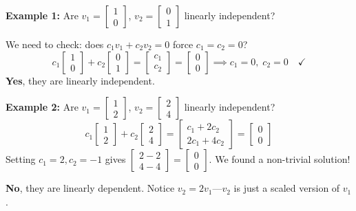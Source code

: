 \documentclass[11pt]{article}
\theoremstyle{definition}
\theoremstyle{plain}
\theoremstyle{remark}
\begin{document}
\begin{workedexample}[title=\textbf{Worked Example: Testing linear independence}]
\textbf{Example 1:} Are $v_1 = \begin{bmatrix}1\\0\end{bmatrix}$, $v_2 = \begin{bmatrix}0\\1\end{bmatrix}$ linearly independent?

We need to check: does $c_1 v_1 + c_2 v_2 = 0$ force $c_1 = c_2 = 0$?
\[
c_1\begin{bmatrix}1\\0\end{bmatrix} + c_2\begin{bmatrix}0\\1\end{bmatrix} = \begin{bmatrix}c_1\\c_2\end{bmatrix} = \begin{bmatrix}0\\0\end{bmatrix} \implies c_1 = 0, \; c_2 = 0 \quad \checkmark
\]
\textbf{Yes}, they are linearly independent.

\medskip
\textbf{Example 2:} Are $v_1 = \begin{bmatrix}1\\2\end{bmatrix}$, $v_2 = \begin{bmatrix}2\\4\end{bmatrix}$ linearly independent?
\[
c_1\begin{bmatrix}1\\2\end{bmatrix} + c_2\begin{bmatrix}2\\4\end{bmatrix} = \begin{bmatrix}c_1 + 2c_2\\2c_1 + 4c_2\end{bmatrix} = \begin{bmatrix}0\\0\end{bmatrix}
\]
Setting $c_1 = 2, c_2 = -1$ gives $\begin{bmatrix}2-2\\4-4\end{bmatrix} = \begin{bmatrix}0\\0\end{bmatrix}$. We found a non-trivial solution!

\textbf{No}, they are linearly dependent. Notice $v_2 = 2v_1$---$v_2$ is just a scaled version of $v_1$.
\end{workedexample}
\end{document}
